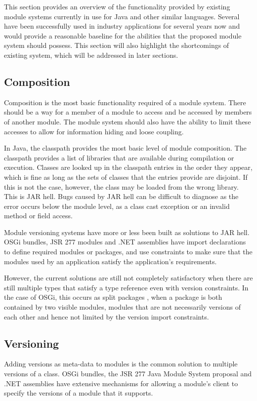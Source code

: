 This section provides an overview of the functionality provided by existing module systems currently 
in use for Java and other similar languages. 
Several \cite{javajars, OSGi4, netassemblies} have been successfully used in industry 
applications for several years now and would provide a reasonable baseline
for the abilities that the proposed module system should possess. This section will also
highlight the shortcomings of existing system, which will be addressed in later sections.

\subsection{Composition}

Composition is the most basic functionality required of a module system. There
should be a way for a member of a module to access and be accessed by members of
another module. The module system should also have the ability to limit
these accesses to allow for information hiding and loose coupling.

In Java, the classpath provides the most basic level of module composition. 
The classpath provides a list of libraries that are
available during compilation or execution. Classes are looked up in the 
classpath entries in the order they appear, which is fine as long as the sets 
of classes that the entries provide are disjoint. If this is not the case, however, the class may
be loaded from the wrong library. This is JAR hell. Bugs caused by JAR hell
can be difficult to diagnose as the error occurs below the module level, as 
a class cast exception or an invalid method or field access.

Module versioning systems have more or less been built as solutions to JAR hell. 
OSGi \cite{OSGi4} bundles, JSR 277 modules \cite{JSR277} and .NET assemblies \cite{netassemblies}
have import declarations to define required modules or packages, and use constraints 
to make sure that the modules used by an application satisfy the 
application's requirements. 

However, the current solutions are still not completely satisfactory when there are still multiple
types that satisfy a type reference even with version constraints. In the case
of OSGi, this occurs as split packages \cite{iJAMComments}, when a package is both contained by
two visible modules, modules that are not necessarily versions of each other
and hence not limited by the version import constraints.

\subsection{Versioning}
Adding versions as meta-data to modules is the common solution to multiple
versions of a class. OSGi bundles, the JSR 277 Java Module System
proposal and .NET assemblies have extensive mechanisms for allowing a 
module's client to specify the versions of a module that it supports.

